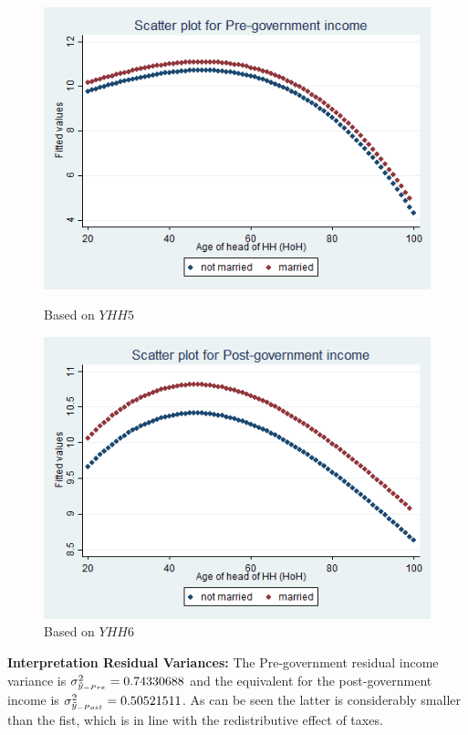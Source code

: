 \documentclass[12pt,a4paper]{article}
\begin{document}
\begin{figure}[h]
  \centering
  \begin{minipage}[b]{0.45\textwidth}
    \includegraphics[width=\textwidth]{PS4/graphs/smoothed_yy5b_hat.png}
    \caption{Based on $YHH5$}
  \end{minipage}
  \hfill
  \begin{minipage}[b]{0.45\textwidth}
    \includegraphics[width=\textwidth]{PS4/graphs/smoothed_yy6b_hat.png}
    \caption{Based on $YHH6$}
  \end{minipage}
\end{figure}

\textbf{Interpretation Residual Variances:} The Pre-government residual income variance is $\sigma^2_{\Tilde{y}_{-Pre}} = 0.74330688$ and the equivalent for the post-government income is $\sigma^2_{\Tilde{y}_{-Post}} = 0.50521511$. As can be seen the latter is considerably smaller than the fist, which is in line with the redistributive effect of taxes. 
\end{document}
